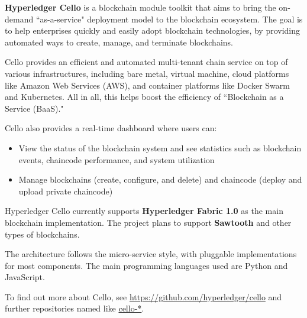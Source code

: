 \textbf{Hyperledger Cello} is a blockchain module toolkit that aims to bring the on-demand ``as-a-service" deployment model to the blockchain ecosystem.
The goal is to help enterprises quickly and easily adopt blockchain technologies, by providing automated ways to create, manage, and terminate blockchains. 

Cello provides an efficient and automated multi-tenant chain service on top of various infrastructures, including bare metal, virtual machine, cloud platforms like Amazon Web Services (AWS), and container platforms like Docker Swarm and Kubernetes. 
All in all, this helps boost the efficiency of ``Blockchain as a Service (BaaS)." 

Cello also provides a real-time dashboard where users can: 
\begin{itemize}
\item  View the status of the blockchain system and see statistics such as blockchain events, chaincode performance, and system utilization
\item Manage blockchains (create, configure, and delete) and chaincode (deploy and upload private chaincode)
\end{itemize}

Hyperledger Cello currently supports \textbf{Hyperledger Fabric 1.0} as the main blockchain implementation. 
The project plans to support \textbf{Sawtooth} and other types of blockchains. 

The architecture follows the micro-service style, with pluggable implementations for most components. 
The main programming languages used are Python and JavaScript.

To find out more about Cello, see  \url{https://github.com/hyperledger/cello} and further repositories named like \url{cello-*}.
